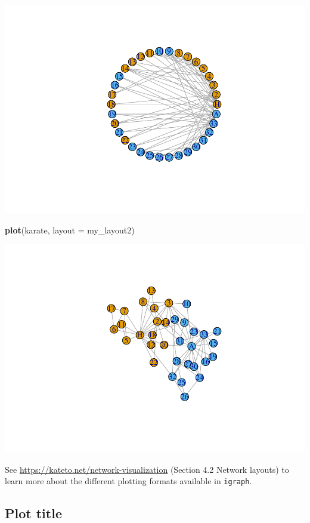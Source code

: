 \documentclass[
]{book}
\newenvironment{Shaded}{\begin{snugshade}}{\end{snugshade}}
\newcommand{\AttributeTok}[1]{\textcolor[rgb]{0.13,0.29,0.53}{#1}}
\newcommand{\FunctionTok}[1]{\textcolor[rgb]{0.13,0.29,0.53}{\textbf{#1}}}
\newcommand{\NormalTok}[1]{#1}
\begin{document}
\includegraphics{bookdown-demo_files/figure-latex/unnamed-chunk-135-1.pdf}

\begin{Shaded}
\begin{Highlighting}[]
\FunctionTok{plot}\NormalTok{(karate, }\AttributeTok{layout =}\NormalTok{ my\_layout2)}
\end{Highlighting}
\end{Shaded}

\includegraphics{bookdown-demo_files/figure-latex/unnamed-chunk-135-2.pdf}

See \url{https://kateto.net/network-visualization} (Section 4.2 Network layouts) to learn more about the different plotting formats available in \texttt{igraph}.

\subsection{Plot title}\label{plot-title}
\end{document}
